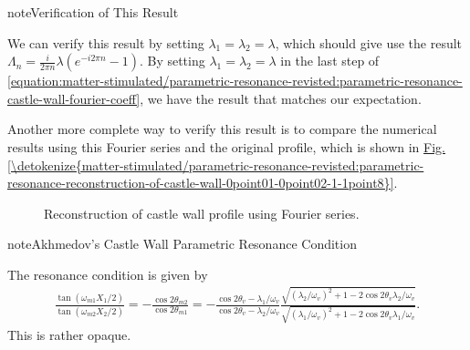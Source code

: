 \documentclass[letterpaper,12pt,english]{sphinxmanual}
\begin{document}
\begin{sphinxadmonition}{note}{Verification of This Result}

We can verify this result by setting \(\lambda_1 =\lambda_2 = \lambda\), which should give use the result \(\Lambda_n = \frac{i}{2\pi n}\lambda (e^{- i 2\pi n} - 1)\). By setting \(\lambda_1 =\lambda_2 = \lambda\) in the last step of \eqref{equation:matter-stimulated/parametric-resonance-revisted:parametric-resonance-castle-wall-fourier-coeff}, we have the result that matches our expectation.

Another more complete way to verify this result is to compare the numerical results using this Fourier series and the original profile, which is shown in \hyperref[\detokenize{matter-stimulated/parametric-resonance-revisted:parametric-resonance-reconstruction-of-castle-wall-0point01-0point02-1-1point8}]{Fig.\@ \ref{\detokenize{matter-stimulated/parametric-resonance-revisted:parametric-resonance-reconstruction-of-castle-wall-0point01-0point02-1-1point8}}}.
\begin{figure}[htbp]
\centering
\capstart

\noindent{}
\caption{Reconstruction of castle wall profile using Fourier series.}\label{\detokenize{matter-stimulated/parametric-resonance-revisted:parametric-resonance-reconstruction-of-castle-wall-0point01-0point02-1-1point8}}\label{\detokenize{matter-stimulated/parametric-resonance-revisted:id3}}\end{figure}
\end{sphinxadmonition}

\begin{sphinxadmonition}{note}{Akhmedov's Castle Wall Parametric Resonance Condition}

The resonance condition is given by
\begin{equation*}
\begin{split}\frac{\tan (\omega_{m1}X_1/2)}{\tan (\omega_{m2}X_2/2)} = - \frac{\cos 2\theta_{m2}}{\cos 2\theta_{m1}} = - \frac{ \cos 2\theta_v - \lambda_1/\omega_v }{  \cos 2\theta_v - \lambda_2/\omega_v } \frac{ \sqrt{ (\lambda_2/\omega_v)^2  + 1 - 2\cos 2\theta_v \lambda_2/\omega_v } }{ \sqrt{ (\lambda_1/\omega_v)^2  + 1 - 2\cos 2\theta_v \lambda_1/\omega_v } }.\end{split}
\end{equation*}
This is rather opaque.
\end{sphinxadmonition}
\end{document}
